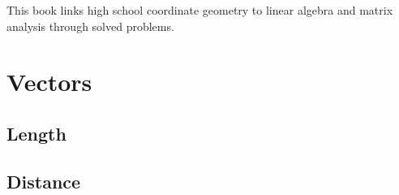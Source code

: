 \documentclass[11pt]{book}
\begin{document}

\setcounter{page}{1}

\begin{introduction}
This book links high school coordinate geometry to linear algebra and matrix analysis through solved problems.

\end{introduction}

\mainmatter

\chapter{Vectors}
\section{Length}

\section{Distance}

\end{document}
